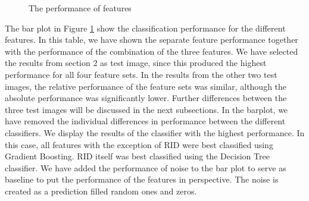 \begin{figure}
	\caption{The performance of features}
	\label{fig:res_bar_0}
\end{figure}


The bar plot in Figure \ref{fig:res_bar_0} show the classification performance for the different features. In this table, we have shown the separate feature performance together with the performance of the combination of the three features. We have selected the results from section 2 as test image, since this produced the highest performance for all four feature sets. In the results from the other two test images, the relative performance of the feature sets was similar, although the absolute performance was significantly lower. Further differences between the three test images will be discussed in the next subsections.
In the barplot, we have removed the individual differences in performance between the different classifiers. We display the results of the classifier with the highest performance. In this case, all features with the exception of RID were best classified using Gradient Boosting. RID itself was best classified using the Decision Tree classifier.
We have added the performance of noise to the bar plot to serve as baseline to put the performance of the features in perspective. The noise is created as a prediction filled random ones and zeros.





